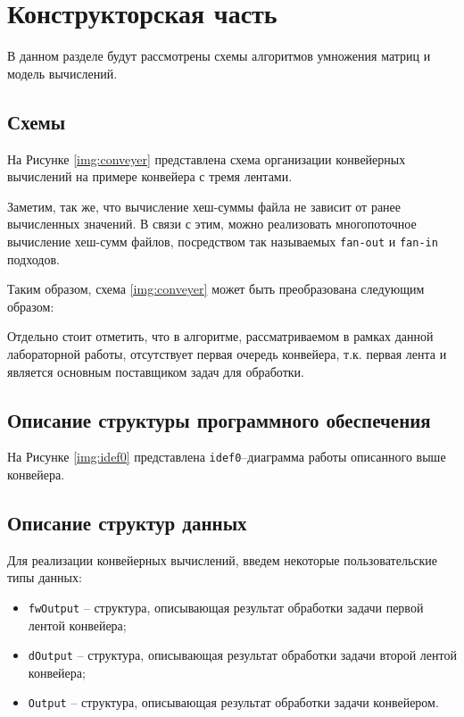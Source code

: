 \chapter{Конструкторская часть}

В данном разделе будут рассмотрены схемы алгоритмов умножения матриц и модель вычислений.

\section{Схемы}
На Рисунке \ref{img:conveyer} представлена схема организации конвейерных вычислений на примере конвейера с тремя лентами. 


Заметим, так же, что вычисление хеш-суммы файла не зависит от ранее вычисленных значений. В связи с этим, можно реализовать многопоточное вычисление хеш-сумм файлов, посредством так называемых \texttt{fan-out} и \texttt{fan-in} подходов.

Таким образом, схема \ref{img:conveyer} может быть преобразована следующим образом:


Отдельно стоит отметить, что в алгоритме, рассматриваемом в рамках данной лабораторной работы, отсутствует первая очередь конвейера, т.к. первая лента и является основным поставщиком задач для обработки.

\section{Описание структуры программного обеспечения}

На Рисунке \ref{img:idef0} представлена \texttt{idef0}--диаграмма работы описанного выше конвейера.


\section{Описание структур данных}

Для реализации конвейерных вычислений, введем некоторые пользовательские типы данных:

\begin{itemize}
    \item \texttt{fwOutput} -- структура, описывающая результат обработки задачи первой лентой конвейера;
    \item \texttt{dOutput} -- структура, описывающая результат обработки задачи второй лентой конвейера;
    \item \texttt{Output} -- структура, описывающая результат обработки задачи конвейером.
\end{itemize}

